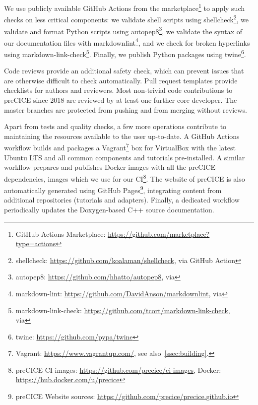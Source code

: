 We use publicly available GitHub Actions from the marketplace\footnote{GitHub Actions Marketplace: \url{https://github.com/marketplace?type=actions}} to apply such checks on less critical components:
we validate shell scripts using shellcheck\footnote{shellcheck: \url{https://github.com/koalaman/shellcheck}, via GitHub Action },
we validate and format Python scripts using autopep8\footnote{autopep8: \url{https://github.com/hhatto/autopep8}, via },
we validate the syntax of our documentation files with markdownlint\footnote{markdown-lint: \url{https://github.com/DavidAnson/markdownlint}, via },
and we check for broken hyperlinks using markdown-link-check\footnote{markdown-link-check: \url{https://github.com/tcort/markdown-link-check},\\ via }.
Finally, we publish Python packages using twine\footnote{twine: \url{https://github.com/pypa/twine}}.

Code reviews provide an additional safety check, which can prevent issues that are otherwise difficult to check automatically. Pull request templates provide checklists for authors and reviewers. Most non-trivial code contributions to preCICE since 2018 are reviewed by at least one further core developer. The master branches are protected from pushing and from merging without reviews.

Apart from tests and quality checks, a few more operations contribute to maintaining the resources available to the user up-to-date. A GitHub Actions workflow builds and packages a Vagrant\footnote{Vagrant: \url{https://www.vagrantup.com/}, see also~\autoref{ssec:building}.} box for VirtualBox with the latest Ubuntu LTS and all common components and tutorials pre-installed. A similar workflow prepares and publishes Docker images with all the preCICE dependencies, images which we use for our CI\footnote{preCICE CI images: \url{https://github.com/precice/ci-images}, Docker: \url{https://hub.docker.com/u/precice}}. The website of preCICE is also automatically generated using GitHub Pages\footnote{preCICE Website sources: \url{https://github.com/precice/precice.github.io}}, integrating content from additional repositories (tutorials and adapters). Finally, a dedicated workflow periodically updates the Doxygen-based C++ source documentation.
